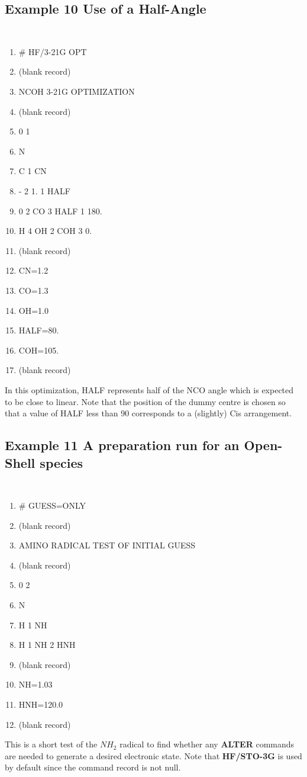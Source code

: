 \subsection{\sf Example 10 Use of a Half-Angle}
{\tt 
\begin{enumerate}
\item   \# HF/3-21G OPT
\item  (blank record)
\item   NCOH 3-21G OPTIMIZATION
\item  (blank record)
\item   0 1
\item   N
\item   C 1 CN
\item   - 2 1. 1 HALF
\item   0 2 CO 3 HALF 1 180.
\item   H 4 OH 2  COH 3   0.
\item  (blank record)
\item   CN=1.2
\item   CO=1.3
\item   OH=1.0
\item   HALF=80.
\item   COH=105.
\item  (blank record)
\end{enumerate}
}
In this optimization, HALF represents half of the NCO angle which is expected
to be close to linear.  Note that the position of the dummy centre is chosen
so that a value of HALF less than 90  corresponds to a (slightly) Cis
arrangement.
\newpage
\subsection{\sf Example 11 A preparation run for an Open-Shell species}
{\tt 
\begin{enumerate}
\item  \# GUESS=ONLY
\item (blank record)
\item  AMINO RADICAL  TEST OF INITIAL GUESS
\item (blank record)
\item  0 2
\item  N
\item  H 1 NH
\item  H 1 NH 2 HNH
\item (blank record)
\item  NH=1.03
\item  HNH=120.0
\item (blank record)
\end{enumerate}
}
This is a short test of the $NH_2$  radical to find whether any
{\bf ALTER} commands are needed to generate a desired electronic state.
Note that {\bf HF/STO-3G} is used by default since the command record
is not null.
\newpage
